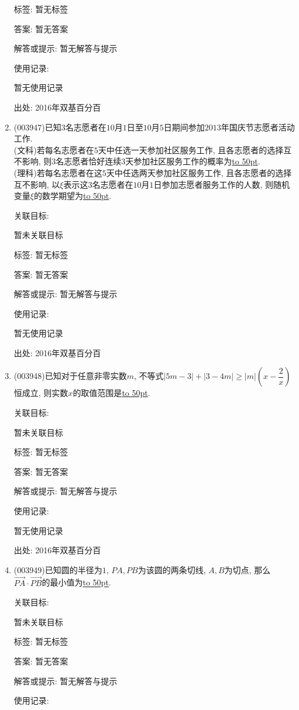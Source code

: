 \documentclass[10pt,a4paper]{article}
\newcommand{\blank}[1]{\underline{\hbox to #1pt{}}}
\begin{document}
\begin{enumerate}[1.]
标签: 暂无标签

答案: 暂无答案

解答或提示: 暂无解答与提示

使用记录:

暂无使用记录


出处: 2016年双基百分百
\item { (003947)}已知$3$名志愿者在$10$月$1$日至$10$月$5$日期间参加$2013$年国庆节志愿者活动工作.\\
(文科)若每名志愿者在$5$天中任选一天参加社区服务工作, 且各志愿者的选择互不影响, 则$3$名志愿者恰好连续$3$天参加社区服务工作的概率为\blank{50}.\\
(理科)若每名志愿者在这$5$天中任选两天参加社区服务工作, 且各志愿者的选择互不影响, 以$\xi$表示这$3$名志愿者在$10$月$1$日参加志愿者服务工作的人数, 则随机变量$\xi$的数学期望为\blank{50}.


关联目标:

暂未关联目标



标签: 暂无标签

答案: 暂无答案

解答或提示: 暂无解答与提示

使用记录:

暂无使用记录


出处: 2016年双基百分百
\item { (003948)}已知对于任意非零实数$m$, 不等式$|5m-3|+|3-4m|\ge |m|\left(x-\dfrac 2x\right)$恒成立, 则实数$x$的取值范围是\blank{50}.


关联目标:

暂未关联目标



标签: 暂无标签

答案: 暂无答案

解答或提示: 暂无解答与提示

使用记录:

暂无使用记录


出处: 2016年双基百分百
\item { (003949)}已知圆的半径为$1$, $PA,PB$为该圆的两条切线, $A,B$为切点, 那么$\overrightarrow{PA}\cdot\overrightarrow{PB}$的最小值为\blank{50}.


关联目标:

暂未关联目标



标签: 暂无标签

答案: 暂无答案

解答或提示: 暂无解答与提示

使用记录:


\end{enumerate}
\end{document}
